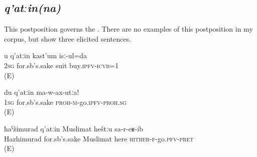 
\subsection{\textit{q'atːin(na)} }
\label{ssec:postposition qatinna}

This postposition governs the . There are no examples of this postposition in my corpus, but  show three elicited sentences.

\begin{exe}
	\ex
	\begin{xlist}
		\ex	\label{Because of you I bought a suit}
		\gll	u	q'atːin	kast'um	isː-ul=da\\
			2\textsc{sg}	for.sb's.sake	suit	buy.\textsc{ipfv}-\textsc{icvb}=1\\
		\glt	{} (E)

		\ex	\label{For my sake do not go}
		\gll	du	q'atːin	ma-w-ax-utːa!\\
			1\textsc{sg}	for.sb's.sake	\textsc{proh}-\textsc{m}-go.\textsc{ipfv}-\textsc{proh}.\textsc{sg}\\
		\glt	{} (E)

		\ex	\label{For the sake of Hazhimurad, Muslimat came here}
		\gll	ħaˁžimurad	q'atːin	Muslimat	heštːu	sa-r-eʁ-ib\\
			Hazhimurad	for.sb's.sake	Muslimat	here	\textsc{hither}-\textsc{f}-go.\textsc{pfv}-\textsc{pret}\\
		\glt	{} (E)
	\end{xlist}
\end{exe}



\subsection{ }
\label{ssec:postposition hasible}

